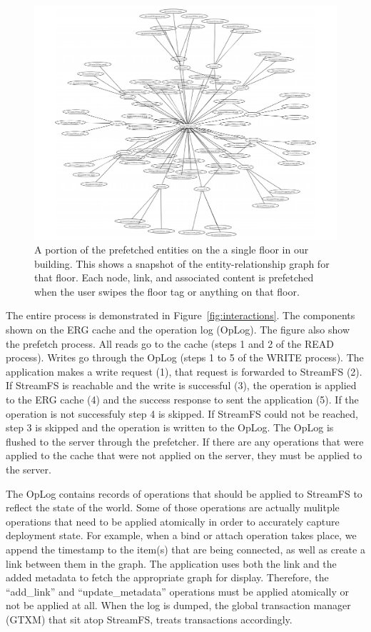 \begin{figure}[htb!]
\begin{center}
\includegraphics[scale=0.45]{figs/SDH_4F_ERG_closeup}
\caption{A portion of the prefetched entities on the a single floor in our building.  This shows a snapshot of the entity-relationship
graph for that floor.  Each node, link, and associated content is prefetched when the user swipes the floor
tag or anything on that floor.}
\label{fig:sdh_4f_erg}
\end{center}
\end{figure}

The entire process is demonstrated in Figure~\ref{fig:interactions}.  The components shown on the ERG cache and the operation
log (OpLog).  The figure also show the prefetch process.  
All reads go to the cache (steps 1 and 2 of the READ process).  Writes go through the OpLog (steps 1 to 5 of the WRITE process).  
The application makes a write request (1), that request is forwarded to StreamFS (2).  If StreamFS is reachable and the write is
successful (3), the operation is applied to the ERG cache (4) and the success response to sent the application (5).
If the operation is not successfuly step 4 is skipped.  If StreamFS could not be reached, step 3 is skipped and the operation
is written to the OpLog.  The OpLog is flushed to the server through the prefetcher.  If there are any operations that were applied 
to the cache that were not applied on the server, they must be applied to the server.

The OpLog contains records of operations that should be applied to StreamFS to reflect the state of the world.  Some of those operations
are actually mulitple operations that need to be applied atomically in order to accurately capture deployment state.  For example, 
when a bind or attach operation takes place, we append the timestamp to the item(s) that are being connected, as well as create
a link between them in the graph.  The application uses both the link and the added metadata to fetch the appropriate
graph for display.  Therefore, the ``add\_link'' and ``update\_metadata'' operations must be applied atomically or not be applied at all.
When the log is dumped, the global transaction manager (GTXM) that sit atop StreamFS, treats transactions accordingly.

